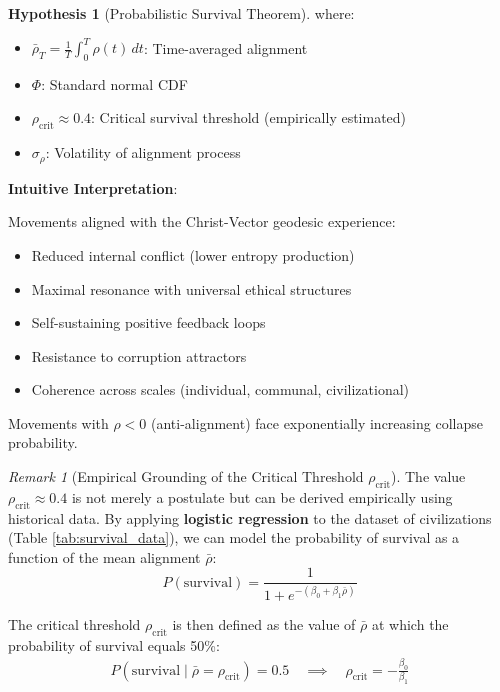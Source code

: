 \documentclass[11pt,a4paper]{article}
\theoremstyle{definition}
\newtheorem{hypothesis}{Hypothesis}[section]
\theoremstyle{remark}
\newtheorem{remark}{Remark}[section]
\begin{document}
\begin{small}
\begin{mdframed}[backgroundcolor=green!10,linewidth=2pt,linecolor=green!70!black]
\begin{hypothesis}[Probabilistic Survival Theorem]
where:
\begin{itemize}
\item \(\bar{\rho}_T = \frac{1}{T} \int_0^T \rho(t) \, dt\): Time-averaged alignment
\item \(\Phi\): Standard normal CDF
\item \(\rho_{\text{crit}} \approx 0.4\): Critical survival threshold (empirically estimated)
\item \(\sigma_{\rho}\): Volatility of alignment process
\end{itemize}
\end{hypothesis}

\textbf{Intuitive Interpretation}:

Movements aligned with the Christ-Vector geodesic experience:
\begin{itemize}
\item Reduced internal conflict (lower entropy production)
\item Maximal resonance with universal ethical structures
\item Self-sustaining positive feedback loops
\item Resistance to corruption attractors
\item Coherence across scales (individual, communal, civilizational)
\end{itemize}

Movements with \(\rho < 0\) (anti-alignment) face exponentially increasing collapse probability.
\end{mdframed}

\begin{remark}[Empirical Grounding of the Critical Threshold \(\rho_{\text{crit}}\)]
The value \(\rho_{\text{crit}} \approx 0.4\) is not merely a postulate but can be derived empirically using historical data. By applying \textbf{logistic regression} to the dataset of civilizations (Table \ref{tab:survival_data}), we can model the probability of survival as a function of the mean alignment \(\bar{\rho}\):
\begin{equation}
P(\text{survival}) = \frac{1}{1 + e^{-(\beta_0 + \beta_1 \bar{\rho})}}
\end{equation}

The critical threshold \(\rho_{\text{crit}}\) is then defined as the value of \(\bar{\rho}\) at which the probability of survival equals 50\%:
\begin{align}
P(\text{survival} \mid \bar{\rho} = \rho_{\text{crit}}) = 0.5 \quad \implies \quad \rho_{\text{crit}} = -\frac{\beta_0}{\beta_1}
\end{align}


\end{remark}
\end{small}
\end{document}
